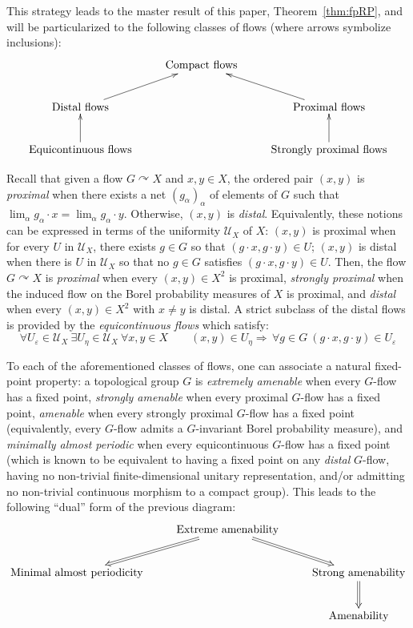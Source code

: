 \documentclass[11pt]{article}
\theoremstyle{definition}
\numberwithin{equation}{section}
\numberwithin{figure}{section}
\numberwithin{table}{section}
\newcommand{\actson}{\curvearrowright}
\let\oldexists\exists
\renewcommand*{\exists}{\mathrel{\oldexists}}
\let\oldforall\forall
\renewcommand*{\forall}{\mathrel{\oldforall}}
\begin{document}
This strategy leads to the master result of this paper, Theorem~\ref{thm:fpRP}, and will be particularized to the following classes of flows (where arrows symbolize inclusions):\label{firstdiagram}
\[
\xymatrix{ & \text{Compact flows} & \\
\text{Distal flows} \ar[ru] & & \text{Proximal flows} \ar[lu]\\
\text{Equicontinuous flows} \ar[u] & & \text{Strongly proximal flows} \ar[u] }
\]

Recall that given a flow $G\actson X$ and $x,y\in X$, the ordered pair $(x,y)$ is \emph{proximal} when there exists a net $(g_{\alpha})_\alpha$ of elements of $G$ such that $\lim_\alpha g_\alpha \cdot x = \lim_\alpha g_\alpha \cdot y$. Otherwise, $(x,y)$ is \emph{distal}. Equivalently, these notions can be expressed in terms of the uniformity $\mathcal U_{X}$ of $X$: $(x,y)$ is proximal when for every $U$ in $\mathcal U_{X}$, there exists $g\in G$ so that $(g\cdot x,g\cdot y)\in U$; $(x,y)$ is distal when there is $U$ in $\mathcal U_{X}$ so that no $g\in G$ satisfies $(g\cdot x,g\cdot y)\in U$. Then, the flow $G\actson X$ is \emph{proximal} when every $(x,y)\in X^{2}$ is proximal, \emph{strongly proximal} when the induced flow on the Borel probability measures of $X$ is proximal, and \emph{distal} when every $(x,y)\in X^{2}$ with $x\neq y$ is distal. A strict subclass of the distal flows is provided by the \emph{equicontinuous flows} which satisfy:
\[
\forall U_{\varepsilon}\in \mathcal U_{X} \ \exists U_{\eta}\in \mathcal U_{X} \ \forall x,y\in X \qquad (x,y)\in U_{\eta} \Rightarrow\, \forall g\in G \ (g\cdot x, g\cdot y)\in U_{\varepsilon}
\]

To each of the aforementioned classes of flows, one can associate a natural fixed-point property: a topological group $G$ is \emph{extremely amenable} when every $G$-flow has a fixed point, \emph{strongly amenable} when every proximal $G$-flow has a fixed point, \emph{amenable} when every strongly proximal $G$-flow has a fixed point (equivalently, every $G$-flow admits a $G$-invariant Borel probability measure), and \emph{minimally almost periodic} when every equicontinuous $G$-flow has a fixed point (which is known to be equivalent to having a fixed point on any \emph{distal} $G$-flow, having no non-trivial finite-dimensional unitary representation, and/or admitting no non-trivial \hbox{continuous} \hbox{morphism} to a compact group). This leads to the following ``dual'' form of the previous diagram:
\[
\xymatrix{ & \text{Extreme amenability} \ar@{=>}[ld] \ar@{=>}[rd]& \\
\text{Minimal almost periodicity}& & \text{Strong amenability} \ar@{=>}[d]\\
& & \text{Amenability} }
\]
\end{document}
